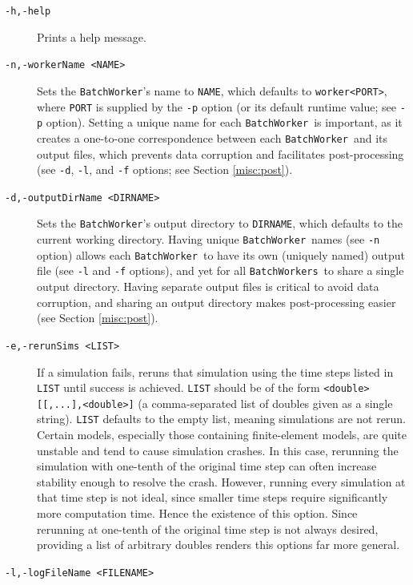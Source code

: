 \documentclass{article}
\newcommand{\BW}{{\tt BatchWorker}}
\newcommand{\BWs}{{\tt BatchWorkers}}
\begin{document}
\begin{description}

\item[{\tt -h,-help} ] \mbox{}

Prints a help message.

\item[{\tt -n,-workerName <NAME>} ] \mbox{}

Sets the \BW's name to {\tt NAME}, which defaults to {\tt worker<PORT>}, where {\tt PORT} is supplied by the {\tt -p} option (or its default runtime value; see {\tt -p} option). Setting a unique name for each \BW\ is important, as it creates a one-to-one correspondence between each \BW\ and its output files, which prevents data corruption and facilitates post-processing (see {\tt -d}, {\tt -l}, and {\tt -f} options; see Section \ref{misc:post}).

\item[{\tt -d,-outputDirName <DIRNAME>} ] \mbox{}

Sets the \BW's output directory to {\tt DIRNAME}, which defaults to the current working directory. Having unique \BW\ names (see {\tt -n} option) allows each \BW\ to have its own (uniquely named) output file (see {\tt -l} and {\tt -f} options), and yet for all \BWs\ to share a single output directory. Having separate output files is critical to avoid data corruption, and sharing an output directory makes post-processing easier (see Section \ref{misc:post}).

\item[{\tt -e,-rerunSims <LIST>} ] \mbox{}

If a simulation fails, reruns that simulation using the time steps listed in {\tt LIST} until success is achieved. {\tt LIST} should be of the form {\tt <double>[[,...],<double>]} (a comma-separated list of doubles given as a single string). {\tt LIST} defaults to the empty list, meaning simulations are not rerun. Certain models, especially those containing finite-element models, are quite unstable and tend to cause simulation crashes. In this case, rerunning the simulation with one-tenth of the original time step can often increase stability enough to resolve the crash. However, running every simulation at that time step is not ideal, since smaller time steps require significantly more computation time. Hence the existence of this option. Since rerunning at one-tenth of the original time step is not always desired, providing a list of arbitrary doubles renders this options far more general.

\item[{\tt -l,-logFileName <FILENAME>} ] \mbox{}


\end{description}
\end{document}
